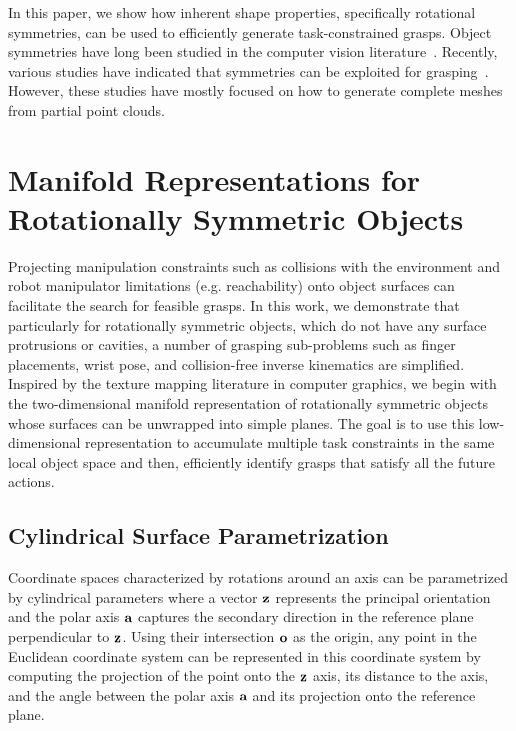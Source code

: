 \documentclass{aamas2015}
\begin{document}
In this paper, we show how inherent shape properties, specifically
rotational symmetries, can be used to efficiently generate 
task-constrained grasps. Object symmetries have long
been studied in the computer vision literature~\cite{}.
Recently, various studies have indicated that symmetries 
can be exploited for grasping~\cite{kroemerHumanoids2012, bohg2011mind}. However, 
these studies have mostly focused on how to generate complete 
meshes from partial point clouds.

\newpage
\section{Manifold Representations for \\Rotationally Symmetric Objects}

Projecting manipulation constraints such as collisions with the environment and robot
manipulator limitations (e.g. reachability) onto object surfaces can facilitate the search
for feasible grasps. In this work, we demonstrate that particularly for rotationally
symmetric objects, which do not have any surface protrusions or cavities, a number of grasping sub-problems
such as finger placements, wrist pose, and collision-free inverse kinematics are simplified. 
Inspired by the texture mapping literature in computer graphics, we begin with the two-dimensional manifold
representation of rotationally symmetric objects whose surfaces can be unwrapped
into simple planes. The goal is to use this low-dimensional representation to accumulate
multiple task constraints in the same local object space and then, efficiently identify 
grasps that satisfy all the future actions. 

\subsection{Cylindrical Surface Parametrization}

Coordinate spaces characterized by rotations around an axis can be parametrized by cylindrical
parameters where a vector $\textbf{z}$ represents the principal orientation and the polar axis
$\textbf{a}$ captures the secondary direction in the reference plane perpendicular to $\textbf{z}$. 
Using their intersection $\textbf{o}$ as the origin, any point in the Euclidean coordinate system can
be represented in this coordinate system by computing the projection of the point onto the
$\textbf{z}$ axis, its distance to the axis, and the angle between the polar axis $\textbf{a}$ and its
projection onto the reference plane. 
\end{document}
